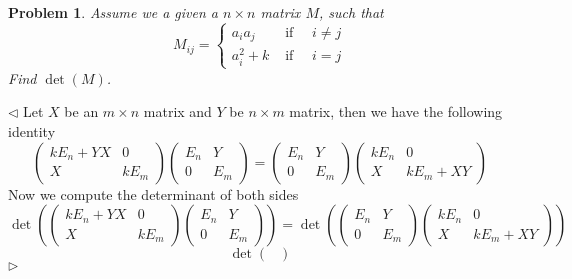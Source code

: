 \documentclass[12pt]{article}
\newtheorem{problem}{Problem}[subsection]
\newenvironment{solution}{\par $\triangleleft$}{$\triangleright$}
\begin{document}
\begin{problem} Assume we a given a $n\times n$ matrix $M$, such that
$$
    M_{ij}=\begin{cases}
        a_i a_j & \mbox{ if }\quad i\neq j \\
        a_i^2+k & \mbox{ if }\quad i=j
    \end{cases}
$$
Find $\det(M)$.
\end{problem}
\begin{solution}
    Let $X$ be an $m\times n$ matrix and $Y$ be $n\times m$ matrix, then we have
    the following identity
    $$
        \begin{pmatrix}
            kE_n+YX & 0    \\
            X       & kE_m
        \end{pmatrix}
        \begin{pmatrix}
            E_n & Y   \\
            0   & E_m
        \end{pmatrix}
        =\begin{pmatrix}
            E_n & Y   \\
            0   & E_m
        \end{pmatrix}
        \begin{pmatrix}
            kE_n & 0         \\
            X    & kE_m + XY
        \end{pmatrix}
    $$
    Now we compute the determinant of both sides
    $$
        \det\left(
        \begin{pmatrix}
                kE_n+YX & 0    \\
                X       & kE_m
            \end{pmatrix}
        \begin{pmatrix}
                E_n & Y   \\
                0   & E_m
            \end{pmatrix}
        \right)
        =
        \det\left(
        \begin{pmatrix}
                E_n & Y   \\
                0   & E_m
            \end{pmatrix}
        \begin{pmatrix} kE_n & 0       \\
                X    & kE_m+XY
            \end{pmatrix}
        \right)
    $$
    $$
        \det\begin{pmatrix}

\end{pmatrix}$$
\end{solution}
\end{document}
